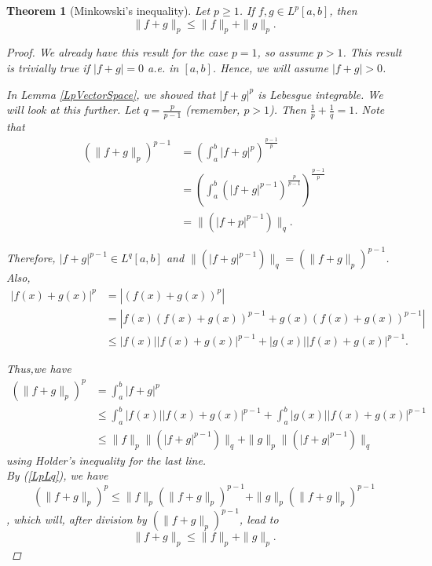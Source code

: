 \documentclass[12pt]{amsart}
\theoremstyle{plain}
\newtheorem{thm}{Theorem}[section]
\theoremstyle{definition}
\theoremstyle{remark}
\numberwithin{equation}{section}
\numberwithin{thm}{section}
\begin{document}
\begin{thm}[Minkowski's inequality]
Let $p \geq 1$. If $f,g \in L^p[a, b]$, then
\[
\|f + g\|_p \leq \|f\|_p + \|g\|_p.
\]
\begin{proof}
We already have this result for the case $p = 1$, so assume $p > 1$. This result is trivially true if $|f + g| = 0$ a.e. in $[a, b]$. Hence, we will assume $|f + g| > 0$.

In Lemma \ref{LpVectorSpace}, we showed that $|f + g|^p$ is Lebesgue integrable. We will look at this further. Let $q = \frac{p}{p-1}$ (remember, $p > 1$). Then $\frac{1}{p} + \frac{1}{q} = 1$. Note that
  \begin{equation}
  \label{LpLq}
    \begin{aligned}
(\|f + g\|_p)^{p-1} & = ( \int_a^b |f + g|^p )^{\frac{p-1}{p}}\\
& = \left( \int_a^b (|f + g|^{p-1})^{\frac{p}{p-1}} \right) ^{\frac{p-1}{p}}  \\
& = \|(|f+p|^{p-1})\|_q.
  \end{aligned}
\end{equation}

 
Therefore, $|f + g|^{p-1} \in L^q[a, b]$ and $\|(|f + g|^{p-1})\|_q = \left(\|f + g\|_p\right)^{p-1}$.
Also, 
\begin{equation*}
\begin{aligned}
|f(x) + g(x)|^p & = |(f(x) + g(x))^p| \\
                & = |f(x)(f(x) + g(x))^{p-1} + g(x)(f(x) + g(x))^{p-1}| \\
                & \leq |f(x)| |f(x) + g(x)|^{p-1} + |g(x)| |f(x) + g(x)|^{p-1}.
\end{aligned}
\end{equation*}

 Thus,we have
\begin{equation*}
\begin{aligned}
         (\|f+g\|_p)^p &= \int_a^b|f+g|^p \\
         & \leq \int_a^b |f(x)||f(x)+g(x)|^{p-1}+\int_a^b |g(x)||f(x)+g(x)|^{p-1} \\
         & \leq \|f\|_p \|(|f+g|^{p-1})\|_q +\|g\|_p\|(|f+g|^{p-1})\|_q        
 \end{aligned}
\end{equation*}
using Holder's inequality for the last line.\\
By (\ref{LpLq}), we have 
\begin{equation*}
     (\|f+g\|_p)^p \leq \|f\|_p (\|f+g\|_p)^{p-1} +\|g\|_p(\|f+g\|_p)^{p-1}   
\end{equation*}
, which will, after division by $(\|f+g\|_p)^{p-1}$, lead to
\begin{equation*}
     \|f+g\|_p \leq \|f\|_p  +\|g\|_p.  
\end{equation*}
\end{proof}    
\end{thm}
\end{document}
